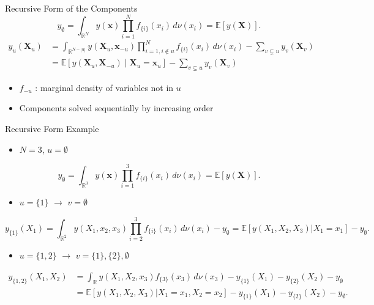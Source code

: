 \begin{frame}{Recursive Form of the Components} %
    \[
    y_{\emptyset} = \int_{\mathbb{R}^N} y(\boldsymbol{x}) \prod_{i=1}^{N} f_{\{i\}}(x_i) \, d\nu (x_i) = \mathbb{E}[y(\boldsymbol{X})].
    \]
\begin{align*}
    y_u(\boldsymbol{X}_u) 
    &= \int_{\mathbb{R}^{N- |u|}} 
        y(\boldsymbol{X}_u, \boldsymbol{x}_{-u}) 
        \prod_{i=1, i \notin u}^{N} f_{\{i\}}(x_i) 
        \, d\nu (x_i) 
      - \sum_{v \subsetneq u} y_v(\boldsymbol{X}_v) \\
    &= \mathbb{E}[y(\boldsymbol{X}_{u}, \boldsymbol{X}_{-u}) \mid \boldsymbol{X}_u = \boldsymbol{x}_u] - \sum_{v \subsetneq u} y_v(\boldsymbol{X}_v)
    \label{eq:fanova_components_classical}
\end{align*}
  \begin{itemize}
    \item $f_{-u}$ : marginal density of variables not in $u$
    \item Components solved sequentially by increasing order
  \end{itemize}
\end{frame}

\begin{frame}{Recursive Form Example}
  \begin{itemize}
    \item $N = 3$, $u = \emptyset$
  \end{itemize}
    \[
    y_{\emptyset} = \int_{\mathbb{R}^3} y(\boldsymbol{x}) \prod_{i=1}^{3} f_{\{i\}}(x_i) \, d\nu (x_i) = \mathbb{E}[y(\boldsymbol{X})].
    \]
  \begin{itemize}
    \item $u = \{1\}$ $\rightarrow$ $v = \emptyset$
  \end{itemize}
    \begin{equation*}
    y_{\{1\}}(X_1) 
    = \int_{\mathbb{R}^{2}} 
        y(X_{1}, x_{2}, x_{3}) 
        \prod_{i=2}^{3} f_{\{i\}}(x_i) 
        \, d\nu (x_i) 
      -  y_{\emptyset} = \mathbb{E}[y(X_1, X_2, X_3)|X_1 = x_1] - y_{\emptyset}.
\end{equation*}
  \begin{itemize}
    \item $u = \{1,2\}$ $\rightarrow$ $v = \{1\}, \{2\}, \emptyset$
  \end{itemize}
    \begin{align*}
    y_{\{1,2\}}(X_1, X_2) 
    &= \int_{\mathbb{R}} 
        y(X_1, X_2, x_3) 
        f_{\{3\}}(x_3) 
        \, d\nu (x_3) 
      -  y_{\{1\}}(X_1) -  y_{\{2\}}(X_2) - y_{\emptyset} \\
    &= \mathbb{E}[y(X_1, X_2, X_3)|X_1 = x_1, X_2 = x_2] - y_{\{1\}}(X_1) - y_{\{2\}}(X_2) - y_{\emptyset}.
\end{align*}
  
\end{frame}


